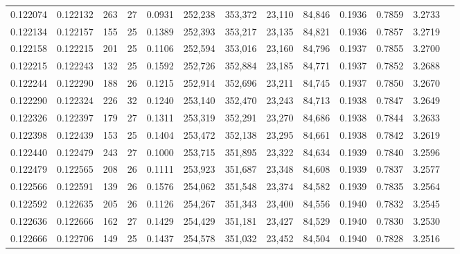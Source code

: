 \begin{tabular}{rrrrrrrrrrrrr}
0.122074 & 0.122132 & 263 &  27 &                                     0.0931 & 252,238 & 353,372 &  23,110 &  84,846 & 0.1936 & 0.7859 & 3.2733 \\
0.122134 & 0.122157 & 155 &  25 &                                     0.1389 & 252,393 & 353,217 &  23,135 &  84,821 & 0.1936 & 0.7857 & 3.2719 \\
0.122158 & 0.122215 & 201 &  25 &                                     0.1106 & 252,594 & 353,016 &  23,160 &  84,796 & 0.1937 & 0.7855 & 3.2700 \\
0.122215 & 0.122243 & 132 &  25 &                                     0.1592 & 252,726 & 352,884 &  23,185 &  84,771 & 0.1937 & 0.7852 & 3.2688 \\
0.122244 & 0.122290 & 188 &  26 &                                     0.1215 & 252,914 & 352,696 &  23,211 &  84,745 & 0.1937 & 0.7850 & 3.2670 \\
0.122290 & 0.122324 & 226 &  32 &                                     0.1240 & 253,140 & 352,470 &  23,243 &  84,713 & 0.1938 & 0.7847 & 3.2649 \\
0.122326 & 0.122397 & 179 &  27 &                                     0.1311 & 253,319 & 352,291 &  23,270 &  84,686 & 0.1938 & 0.7844 & 3.2633 \\
0.122398 & 0.122439 & 153 &  25 &                                     0.1404 & 253,472 & 352,138 &  23,295 &  84,661 & 0.1938 & 0.7842 & 3.2619 \\
0.122440 & 0.122479 & 243 &  27 &                                     0.1000 & 253,715 & 351,895 &  23,322 &  84,634 & 0.1939 & 0.7840 & 3.2596 \\
0.122479 & 0.122565 & 208 &  26 &                                     0.1111 & 253,923 & 351,687 &  23,348 &  84,608 & 0.1939 & 0.7837 & 3.2577 \\
0.122566 & 0.122591 & 139 &  26 &                                     0.1576 & 254,062 & 351,548 &  23,374 &  84,582 & 0.1939 & 0.7835 & 3.2564 \\
0.122592 & 0.122635 & 205 &  26 &                                     0.1126 & 254,267 & 351,343 &  23,400 &  84,556 & 0.1940 & 0.7832 & 3.2545 \\
0.122636 & 0.122666 & 162 &  27 &                                     0.1429 & 254,429 & 351,181 &  23,427 &  84,529 & 0.1940 & 0.7830 & 3.2530 \\
0.122666 & 0.122706 & 149 &  25 &                                     0.1437 & 254,578 & 351,032 &  23,452 &  84,504 & 0.1940 & 0.7828 & 3.2516 \\

\end{tabular}
